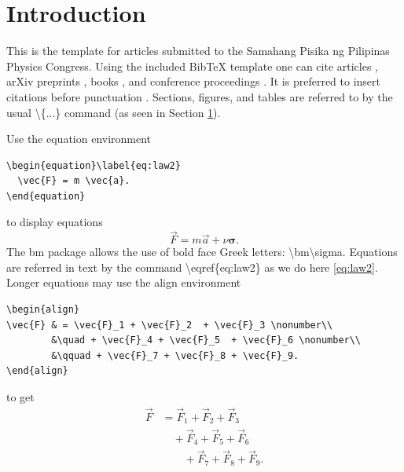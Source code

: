 \documentclass[10pt,a4paper,twoside]{article}
\begin{document}
\maketitle
\thispagestyle{titlestyle}


\section{Introduction}\label{sec:intro}
This is the template for articles submitted to the Samahang Pisika ng Pilipinas Physics Congress. Using the included BibTeX template one can cite articles \cite{articlekey}, arXiv preprints \cite{preprintkey}, books \cite{bookkey}, and conference proceedings \cite{proceedingskey}. It is preferred to insert citations before punctuation \cite{articlekey,preprintkey}. Sections, figures, and tables are referred to by the usual \textbackslash{}\{...\} command (as seen in Section \ref{sec:intro}).

Use the equation environment
\begin{verbatim}
\begin{equation}\label{eq:law2}
  \vec{F} = m \vec{a}.
\end{equation}	 
\end{verbatim}
to display equations
\begin{equation}\label{eq:law2}
		\vec{F} = m \vec{a} + \nu \bm\sigma.
\end{equation}
The {\ttfamily bm} package allows the use of bold face Greek letters: \textbackslash {\ttfamily bm}\textbackslash {\ttfamily sigma}. Equations are referred in text by the command \textbackslash{\ttfamily eqref}\{{\ttfamily eq:law2}\} as we do here \eqref{eq:law2}.
Longer equations may use the align environment
\begin{verbatim}
\begin{align}
\vec{F} & = \vec{F}_1 + \vec{F}_2  + \vec{F}_3 \nonumber\\
        &\quad + \vec{F}_4 + \vec{F}_5  + \vec{F}_6 \nonumber\\
        &\qquad + \vec{F}_7 + \vec{F}_8 + \vec{F}_9.
\end{align}
\end{verbatim}
to get
\begin{align}
\vec{F} & = \vec{F}_1 +  \vec{F}_2  +  \vec{F}_3  \nonumber \\
 &\quad + \vec{F}_4 +  \vec{F}_5  +  \vec{F}_6  \nonumber \\
 &\qquad + \vec{F}_7 + \vec{F}_8 + \vec{F}_9.
\end{align}
\end{document}
